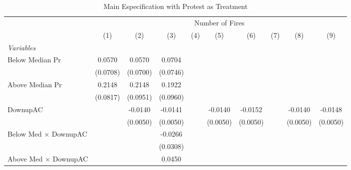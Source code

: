 
\begin{table}[htbp]
   \caption{\label{tab:protest_treat_main} Main Especification with Protest as Treatment}
   \centering
   \begin{tabular}{lccccccccc}
      \tabularnewline \midrule \midrule
       & \multicolumn{9}{c}{Number of Fires}\\
                                      & (1)           & (2)           & (3)           & (4)           & (5)           & (6)           & (7)           & (8)           & (9)\\  
      \midrule
      \emph{Variables}\\
      Below Median Pr                 & 0.0570        & 0.0570        & 0.0704        &               &               &               &               &               &   \\   
                                      & (0.0708)      & (0.0700)      & (0.0746)      &               &               &               &               &               &   \\   
      Above Median Pr                 & 0.2148        & 0.2148        & 0.1922        &               &               &               &               &               &   \\   
                                      & (0.0817)      & (0.0951)      & (0.0960)      &               &               &               &               &               &   \\   
      DownupAC                        &               & -0.0140       & -0.0141       &               & -0.0140       & -0.0152       &               & -0.0140       & -0.0148\\   
                                      &               & (0.0050)      & (0.0050)      &               & (0.0050)      & (0.0050)      &               & (0.0050)      & (0.0050)\\   
      Below Med $\times$ DownupAC     &               &               & -0.0266       &               &               &               &               &               &   \\   
                                      &               &               & (0.0308)      &               &               &               &               &               &   \\   
      Above Med $\times$ DownupAC     &               &               & 0.0450        &               &               &               &               &               &   \\   

\end{tabular}
\end{table}

